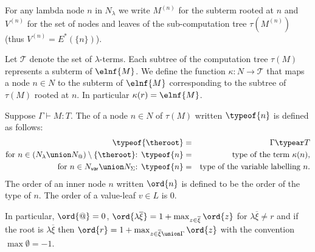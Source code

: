 For any lambda node $n$ in $N_\lambda$ we write
$M^{(n)}$ for the subterm rooted at $n$ and $V^{(n)}$ for the set of nodes and leaves of the sub-computation tree $\tau(M^{(n)})$ (thus $V^{(n)} = E^*(\{n\})$).


Let $\mathcal{T}$ denote the set of $\lambda$-terms.
Each subtree of the computation tree $\tau(M)$ represents a subterm of $\elnf{M}$.
We define the function $\kappa : N \rightarrow \mathcal{T}$ that maps a node $n \in N$ to the subterm of $\elnf{M}$
corresponding to the subtree of $\tau(M)$ rooted at $n$.
In particular $\kappa(r) = \elnf{M}$.

\begin{definition}
\label{def:nodeorder}
Suppose $\Gamma \vdash M : T$.
The  of a node $n \in N$ of $\tau(M)$ written $\typeof{n}$ is defined as follows:
\begin{eqnarray*}
\typeof{\theroot} &=& \Gamma \typear T \\
\hbox{for $n \in (N_\lambda \union N_@) \setminus \{\theroot \}$: } \typeof{n} &=& \hbox{type of the term $\kappa(n)$,} \\
\hbox{ for $n\in N_{\sf var} \union N_\Sigma$: } \typeof{n} &=& \hbox{type of the variable labelling $n$}.
\end{eqnarray*}
The order of an inner node $n$ written $\ord{n}$ is defined to be
the order of the type of $n$. The order of a value-leaf $v \in L$ is
$0$.
\end{definition}

In particular, $\ord{@} = 0$, $\ord{\lambda \overline{\xi}} = 1+
\max_{z\in \overline{\xi}} \ord{z}$ for $\lambda \overline{\xi}\neq
r$ and if the root is $\lambda \overline{\xi}$ then $\ord{r} = 1 + \max_{z\in
\overline{\xi}\union \Gamma} \ord{z}$ with the convention $\max
\emptyset = -1$.

